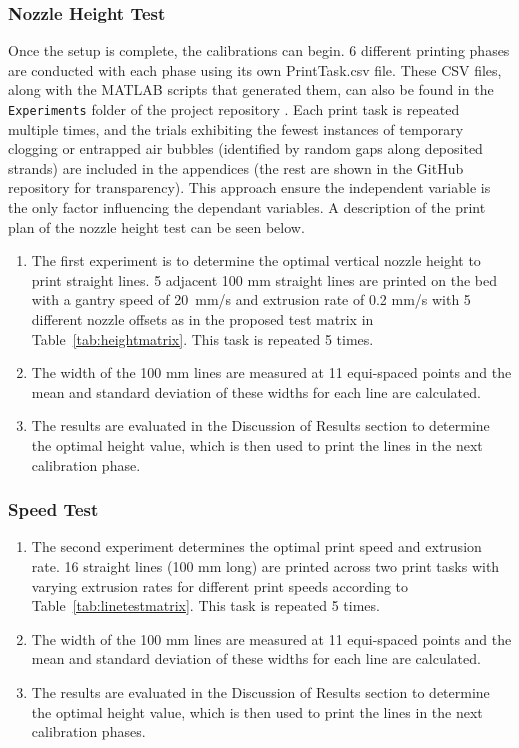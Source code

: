 \subsubsection*{Nozzle Height Test}
Once the setup is complete, the calibrations can begin. 6 different printing phases are conducted with each phase using its own PrintTask.csv file. These CSV files, along with the MATLAB scripts that generated them, can also be found in the \texttt{Experiments} folder of the project repository \citep{Daniel2025_HydrogelPrinter}. Each print task is repeated multiple times, and the trials exhibiting the fewest instances of temporary clogging or entrapped air bubbles (identified by random gaps along deposited strands) are included in the appendices (the rest are shown in the GitHub repository for transparency). This approach ensure the independent variable is the only factor influencing the dependant variables.  A description of the print plan of the nozzle height test can be seen below.

\begin{enumerate}
    \item The first experiment is to determine the optimal vertical nozzle height to print straight lines. 5 adjacent 100 mm straight lines are printed on the bed with a gantry speed of 20~mm/s and extrusion rate of 0.2 mm/s with 5 different nozzle offsets as in the proposed test matrix in Table~\ref{tab:heightmatrix}. This task is repeated 5 times.
    \item The width of the 100 mm lines are measured at 11 equi-spaced points and the mean and standard deviation of these widths for each line are calculated.
    \item The results are evaluated in the Discussion of Results section to determine the optimal height value, which is then used to print the lines in the next calibration phase.
\end{enumerate}

\subsubsection*{Speed Test}
\begin{enumerate}
    \item The second experiment determines the optimal print speed and extrusion rate. 16 straight lines (100 mm long) are printed across two print tasks with varying extrusion rates for different print speeds according to Table~\ref{tab:linetestmatrix}. This task is repeated 5 times.
    \item The width of the 100 mm lines are measured at 11 equi-spaced points and the mean and standard deviation of these widths for each line are calculated.
    \item The results are evaluated in the Discussion of Results section to determine the optimal height value, which is then used to print the lines in the next calibration phases.
\end{enumerate}

